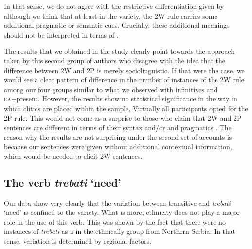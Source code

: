 \documentclass[output=paper,modfonts,newtxmath,hidelinks,]{langscibook}
\begin{document}
\ea \label{7:ex18}
	\z
\z

\noindent In that sense, we do not agree with the restrictive differentiation given by \citet{DiesingEtAl2009} although we think that at least in the  variety, the 2W rule carries some additional pragmatic or semantic cues. Crucially, these additional meanings should not be interpreted in terms of . 

The results that we obtained in the study clearly point towards the approach taken by this second group of authors who disagree with the idea that the difference between 2W and 2P is merely sociolinguistic. If that were the case, we would see a clear pattern of difference in the number of instances of the 2W rule among our four groups similar to what we observed with infinitives and \textsc{da}+present. However, the results show no statistical significance in the way in which clitics are placed within the sample. Virtually all participants opted for the 2P rule. This would not come as a surprise to those who claim that 2W and 2P sentences are different in terms of their syntax \citep{Boskovic2009} and/or  and pragmatics \citep{DiesingEtAl2009}. The reason why the results are not surprising under the second set of accounts is because our sentences were given without additional contextual information, which would be needed to elicit 2W sentences.

\subsection{The verb \textit{trebati} ‘need’}\label{7:s4.3}

Our data show very clearly that the variation between transitive and  \textit{trebati} ‘need’ is confined to the  variety. What is more, ethnicity does not play a major role in the use of this verb. This was shown by the fact that there were no instances of \textit{trebati} as a  in the ethnically  group from Northern Serbia. In that sense, variation is determined by regional factors.
\end{document}
